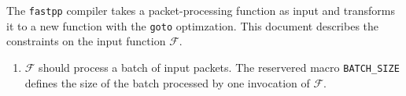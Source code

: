 The \texttt{fastpp} compiler takes a packet-processing function as input and 
transforms it to a new function with the \texttt{goto} optimzation. This document 
describes the constraints on the input function $\mathscr{F}$.

\begin{enumerate}
\item $\mathscr{F}$ should process a batch of input packets. The reservered macro
\texttt{BATCH\_SIZE} defines the size of the batch processed by one invocation
of $\mathscr{F}$.
\end{enumerate}
